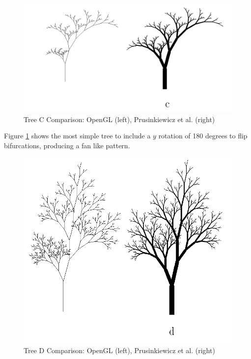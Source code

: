 \documentclass[final]{cmpreport}
\begin{document}
\begin{figure}[ht]
    \includegraphics[scale=0.4]{tree-comp-c.png} 
    \centering
    \captionsetup{justification=centering}
    \caption{Tree C Comparison: OpenGL (left), Prusinkiewicz et al. (right)}
    \label{fig:tree-comp-c}
\end{figure}

\pagebreak
Figure \ref{fig:tree-comp-c} shows the most simple tree to include a $y$ rotation of 180 degrees to flip 
bifurcations, producing a fan like pattern.

\begin{figure}[ht]
    \includegraphics[scale=0.4]{tree-comp-d.png} 
    \centering
    \captionsetup{justification=centering}
    \caption{Tree D Comparison: OpenGL (left), Prusinkiewicz et al. (right)}
    \label{fig:tree-comp-d}
\end{figure}
\end{document}
